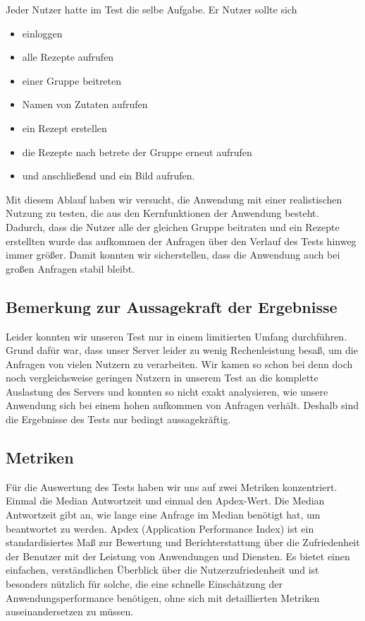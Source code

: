 \documentclass{qualitätssicherungsheft}
\begin{document}
Jeder Nutzer hatte im Test die selbe Aufgabe.
Er Nutzer sollte sich
\begin{itemize}
    \item einloggen
    \item alle Rezepte aufrufen
    \item einer Gruppe beitreten
    \item Namen von Zutaten aufrufen
    \item ein Rezept erstellen
    \item die Rezepte nach betrete der Gruppe erneut aufrufen
    \item und anschließend  und ein Bild aufrufen.
\end{itemize}
Mit diesem Ablauf haben wir versucht, die Anwendung mit einer realistischen Nutzung zu testen, die aus den Kernfunktionen der Anwendung besteht.
Dadurch, dass die Nutzer alle der gleichen Gruppe beitraten und ein Rezepte erstellten wurde das aufkommen der Anfragen über den Verlauf des Tests hinweg immer größer.
Damit konnten wir sicherstellen, dass die Anwendung auch bei großen Anfragen stabil bleibt.

\subsection{Bemerkung zur Aussagekraft der Ergebnisse}
Leider konnten wir unseren Test nur in einem limitierten Umfang durchführen.
Grund dafür war, dass unser Server leider zu wenig Rechenleistung besaß, um die Anfragen von vielen Nutzern zu verarbeiten.
Wir kamen so schon bei denn doch noch vergleichsweise geringen Nutzern in unserem Test an die komplette Auslastung des Servers und konnten so nicht exakt analysieren, wie unsere Anwendung sich bei einem hohen aufkommen von Anfragen verhält.
Deshalb sind die Ergebnisse des Tests nur bedingt aussagekräftig.

\subsection{Metriken}
Für die Auswertung des Tests haben wir uns auf zwei Metriken konzentriert.
Einmal die Median Antwortzeit und einmal den Apdex-Wert.
Die Median Antwortzeit gibt an, wie lange eine Anfrage im Median benötigt hat, um beantwortet zu werden.
Apdex (Application Performance Index) ist ein standardisiertes Maß zur Bewertung und Berichterstattung über die Zufriedenheit der Benutzer mit der Leistung von Anwendungen und Diensten. Es bietet einen einfachen, verständlichen Überblick über die Nutzerzufriedenheit und ist besonders nützlich für solche, die eine schnelle Einschätzung der Anwendungsperformance benötigen, ohne sich mit detaillierten Metriken auseinandersetzen zu müssen.
\end{document}
